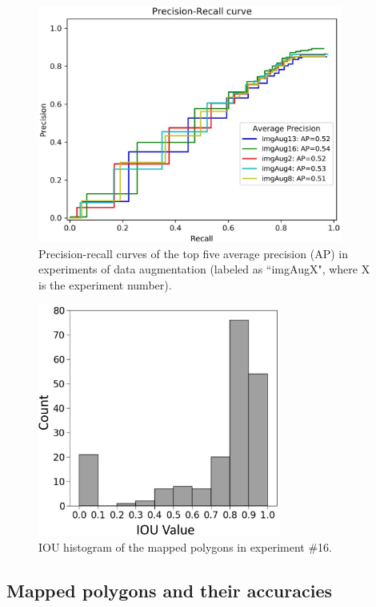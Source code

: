 \documentclass[preprint,12pt,authoryear]{elsarticle}
\begin{document}
\begin{figure}
	\centering
	\includegraphics[width=10cm]{figures/top5_curves_trim.jpg}
	\caption{Precision-recall curves of the top five average precision (AP) in experiments of data augmentation (labeled as ``imgAugX", where X is the experiment number).}
	\label{fig_ap_top5}
\end{figure}

\begin{figure}
	\centering
	\includegraphics[width=8cm]{figures/IoU_imgAug16_label_trim.jpg}
	\caption{IOU histogram of the mapped polygons in experiment \#16.}
	\label{fig_iou_hist_exp16}
\end{figure}

\subsection{Mapped polygons and their accuracies}
\label{subsec_mapped_accuracies}
\end{document}
